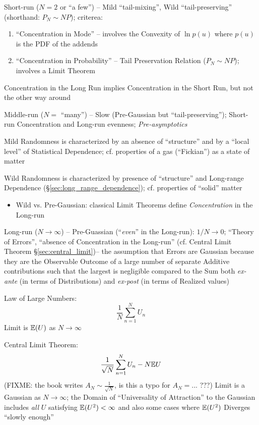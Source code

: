 Short-run ($N=2$ or ``a few'') -- Mild ``tail-mixing'', Wild
``tail-preserving'' (shorthand: $P_N \sim N P$); criterea:
\begin{enumerate}
  \item ``Concentration in Mode'' -- involves the Convexity of $\ln p(u)$ where
    $p(u)$ is the PDF of the addends
  \item ``Concentration in Probability'' -- Tail Preservation Relation
    ($P_N \sim N P$); involves a Limit Theorem
\end{enumerate}

Concentration in the Long Run implies Concentration in the Short Run, but not
the other way around

Middle-run ($N =$ ``many'') -- Slow (Pre-Gaussian but ``tail-preserving'');
Short-run Concentration and Long-run evenness; \emph{Pre-asymptotics}

Mild Randomness is characterized by an absence of ``structure'' and by a ``local
level'' of Statistical Dependence; cf. properties of a gas (``Fickian'') as a
state of matter

Wild Randomness is characterized by presence of ``structure'' and Long-range
Dependence (\S\ref{sec:long_range_dependence}); cf. properties of ``solid''
matter

\begin{itemize}
  \item Wild vs. Pre-Gaussian: classical Limit Theorems define
    \emph{Concentration} in the Long-run
\end{itemize}

Long-run ($N \to \infty$) -- Pre-Guassian (``\emph{even}'' in the Long-run):
$1 / N \to 0$; ``Theory of Errors'', ``absence of Concentration in the
Long-run'' (cf. Central Limit Theorem \S\ref{sec:central_limit})-- the
assumption that Errors are Gaussian because they are the Observable Outcome of a
large number of separate Additive contributions such that the largest is
negligible compared to the Sum both \emph{ex-ante} (in terms of Distributions)
and \emph{ex-post} (in terms of Realized values)

Law of Large Numbers:
\[
  \frac{1}{N} \sum_{n=1}^N U_n
\]
Limit is $\mathbb{E}(U)$ as $N \to \infty$

Central Limit Theorem:
\[
  \frac{1}{\sqrt{N}} \sum_{n=1}^N U_n - N \mathbb{E}{U}
\]
(FIXME: the book writes $A_N \sim \frac{1}{\sqrt{N}}$, is this a typo for
$A_N = ...$ ???)
Limit is a Gaussian as $N \to \infty$; the Domain of ``Universality of
Attraction'' to the Gaussian includes \emph{all} $U$ satisfying $\mathbb{E}(U^2) <
\infty$ and also some cases where $\mathbb{E}(U^2)$ Diverges ``slowly enough''

